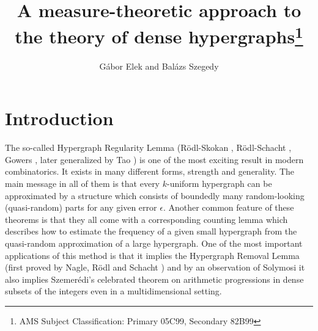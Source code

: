 \documentclass [11pt] {article}
\begin{document}
\title{A measure-theoretic
 approach to the theory of dense hypergraphs\footnote{AMS
Subject Classification: Primary 05C99, Secondary 82B99}}
\author{{\sc G\'abor Elek} and {\sc Bal\'azs Szegedy}}


\maketitle




\newpage

\tableofcontents

\section{Introduction}
The so-called Hypergraph Regularity Lemma (R\"odl-Skokan \cite{RSko},
R\"odl-Schacht \cite{RS},
Gowers \cite{Gow}, later generalized by Tao \cite{Tao}) is one of the
most exciting result
in modern combinatorics. It exists in many different forms, strength
and generality. The main message in all of them is that every
$k$-uniform hypergraph can be approximated by a structure which
consists of boundedly many random-looking (quasi-random) parts for any
given error $\epsilon$. Another common feature of these theorems is
that they all come with a corresponding counting lemma \cite{NRS}
which describes how to estimate the frequency of a given small
hypergraph from the quasi-random approximation of a large hypergraph.
One of the most important applications of this method is that it
implies the Hypergraph Removal Lemma (first proved by
Nagle, R\"odl and Schacht \cite{NRS})  and by an
observation of Solymosi \cite{S} it also
implies Szemer\'edi's celebrated theorem on
arithmetic progressions in dense subsets of the integers even in a
multidimensional setting.
\end{document}
